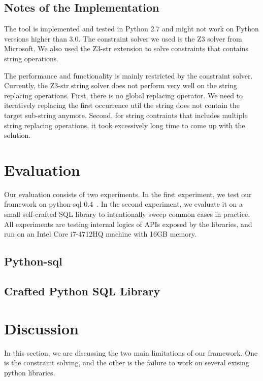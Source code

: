 \documentclass[conference]{IEEEtran}
\begin{document}
\subsection{Notes of the Implementation}

The tool is implemented and tested in Python 2.7 and might not work on Python versions higher than 3.0.
The constraint solver we used is the Z3 solver from Microsoft. We also used the Z3-str extension to solve constraints that contains string operations.

The performance and functionality is mainly restricted by the constraint solver. Currently, the Z3-str string solver does not perform very well on the string replacing operations. First, there is no global replacing operator. We need to iteratively replacing the first occurrence util the string does not contain the target sub-string anymore. Second, for string contraints that includes multiple string replacing operations, it took excessively long time to come up with the solution.


\section{Evaluation}
\label{evaluation}
Our evaluation consists of two experiments. In the first experiment, we test our framework on python-sql 0.4~\cite{python-sql}. In the second experiment, we evaluate it on a small self-crafted SQL library to intentionally sweep common cases in practice. All experiments are testing internal logics of APIs exposed by the libraries, and run on an Intel Core i7-4712HQ machine with 16GB memory.

\subsection{Python-sql}
\label{python-sql}

\subsection{Crafted Python SQL Library}
\label{crafted-sql}

\section{Discussion}
\label{discussion}
In this section, we are discussing the two main limitations of our framework. One is the constraint solving, and the other is the failure to work on several exising python libraries.
\end{document}
